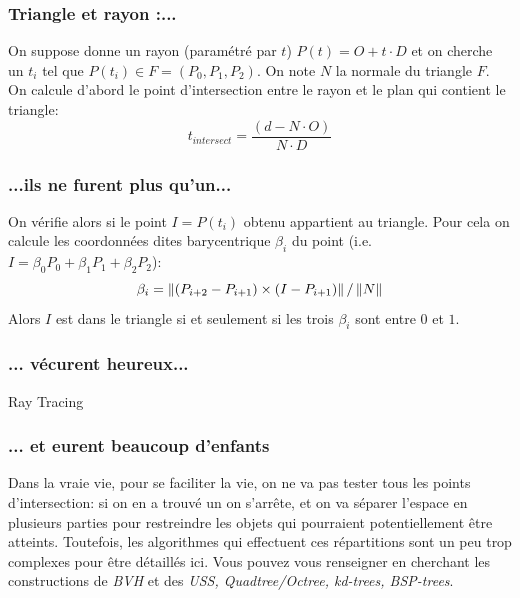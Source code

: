 \documentclass{beamercours}
\begin{document}
\begin{frame}
\frametitle{Triangle et rayon :...}
On suppose donne un rayon (paramétré par $t$) $P(t) = O+ t\cdot D$ et on cherche un $t_{i}$ tel que $P(t_{i}) \in F = (P_{0}, P_{1}, P_{2})$.
On note $N$ la normale du triangle $F$.
On calcule d'abord le point d'intersection entre le rayon et le plan qui contient le triangle:
\begin{equation*}
	t_{intersect} = \frac{\left(d - N\cdot O\right)}{N \cdot D}
\end{equation*}
\end{frame}
\begin{frame}
\frametitle{...ils ne furent plus qu'un...}
On vérifie alors si le point $I = P(t_{i})$ obtenu appartient au triangle. Pour cela on calcule les coordonnées dites barycentrique $\beta_{i}$ du point (i.e. $I = \beta_{0}P_{0} + \beta_{1}P_{1} + \beta_{2}P_{2}$):
\begin{equation*}
	\beta_{i} = \left\lVert \left(P_{i + 2} - P_{i + 1}\right) \times \left(I - P_{i + 1}\right) \right\rVert/\left\lVert N \right\rVert
\end{equation*}
Alors $I$ est dans le triangle si et seulement si les trois $\beta_{i}$ sont entre $0$ et $1$.
\end{frame}

\begin{frame}
\frametitle{... vécurent heureux...}
\begin{algorithm}[H]
	\caption{Ray Tracing}
	\begin{algorithmic}
				\Else
				\EndIf
			\EndIf
		\EndFunction
	\end{algorithmic}
\end{algorithm}
\end{frame}

\begin{frame}
\frametitle{... et eurent beaucoup d'enfants}
Dans la vraie vie, pour se faciliter la vie, on ne va pas tester tous les points d'intersection: si on en a trouvé un on s'arrête, et on va séparer l'espace en plusieurs parties pour restreindre les objets qui pourraient potentiellement être atteints.
Toutefois, les algorithmes qui effectuent ces répartitions sont un peu trop complexes pour être détaillés ici.
Vous pouvez vous renseigner en cherchant les constructions de \emph{BVH} et des \emph{USS, Quadtree/Octree, kd-trees, BSP-trees}.
\end{frame}
\end{document}
